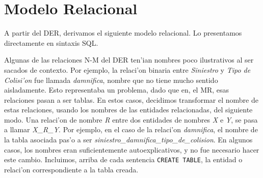 \section{Modelo Relacional}

A partir del DER, derivamos el siguiente modelo relacional. Lo presentamos directamente en sintaxis SQL.

Algunas de las relaciones N-M del DER ten'ian nombres poco ilustrativos al ser sacados de contexto. Por ejemplo, la relaci'on binaria entre \textit{Siniestro} y \textit{Tipo de Colisi'on} fue llamada \textit{damnifica}, nombre que no tiene mucho sentido aisladamente. Esto representaba un problema, dado que en, el MR, esas relaciones pasan a ser tablas. En estos casos, decidimos transformar el nombre de estas relaciones, usando los nombres de las entidades relacionadas, del siguiente modo. Una relaci'on de nombre \textit{R} entre dos entidades de nombres \textit{X} e \textit{Y}, se pasa a llamar \textit{X\_R\_Y}. Por ejemplo, en el caso de la relaci'on \textit{damnifica}, el nombre de la tabla asociada pas'o a ser \textit{siniestro\_damnifica\_tipo\_de\_colision}. En algunos casos, los nombres eran suficientemente autoexplicativos, y no fue necesario hacer este cambio. Incluimos, arriba de cada sentencia \texttt{CREATE TABLE}, la entidad o relaci'on correspondiente a la tabla creada.

